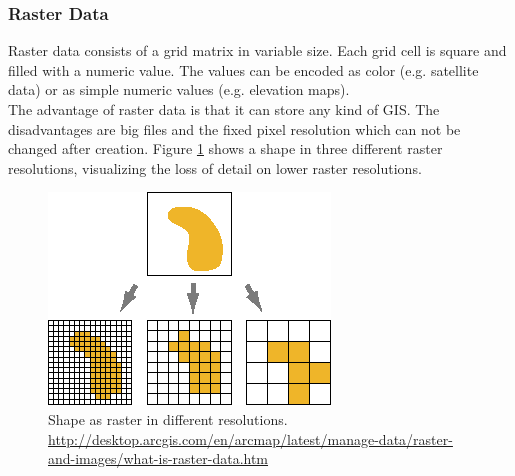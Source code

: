 \subsubsection{Raster Data}
 Raster data consists of a grid matrix in variable size.  Each grid cell is square and filled with a numeric value. The values can be encoded as color (e.g. satellite data) or as simple numeric values (e.g. elevation maps).  \\
 The advantage of raster data is that it can store any kind of GIS. The disadvantages are big files and the fixed pixel resolution which can not be changed after creation. Figure \ref{img:raster} shows a shape in three different raster resolutions, visualizing the loss of detail on lower raster resolutions.
 \begin{figure}[H]
 	\centering\includegraphics[width=.5\textwidth]{res/Vector-Raster}
 	\caption{Shape as raster in different resolutions. \url{http://desktop.arcgis.com/en/arcmap/latest/manage-data/raster-and-images/what-is-raster-data.htm}}
 	\label{img:raster}
 \end{figure}

